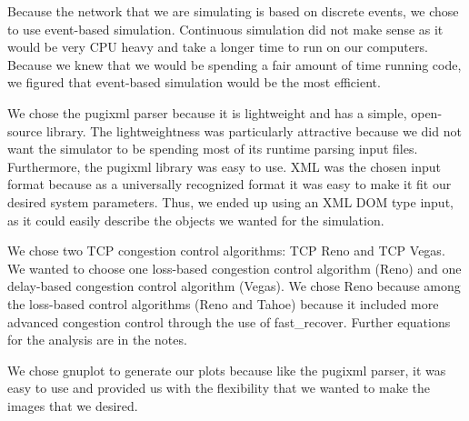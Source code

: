\documentclass{article}
\begin{document}
    Because the network that we are simulating is based on discrete events, we chose to use event-based simulation. Continuous simulation did not make sense as it would be very CPU heavy and take a longer time to run on our computers. Because we knew that we would be spending a fair amount of time running code, we figured that event-based simulation would be the most efficient.

    We chose the pugixml parser because it is lightweight and has a simple, open-source library. The lightweightness was particularly attractive because we did not want the simulator to be spending most of its runtime parsing input files. Furthermore, the pugixml library was easy to use. XML was the chosen input format because as a universally recognized format it was easy to make it fit our desired system parameters. Thus, we ended up using an XML DOM type input, as it could easily describe the objects we wanted for the simulation.

    We chose two TCP congestion control algorithms: TCP Reno and TCP Vegas. We wanted to choose one loss-based congestion control algorithm (Reno) and one delay-based congestion control algorithm (Vegas). We chose Reno because among the loss-based control algorithms (Reno and Tahoe) because it included more advanced congestion control through the use of fast\_recover. Further equations for the analysis are in the notes. 
    
    We chose gnuplot to generate our plots because like the pugixml parser, it was easy to use and provided us with the flexibility that we wanted to make the images that we desired. 











\end{document}
